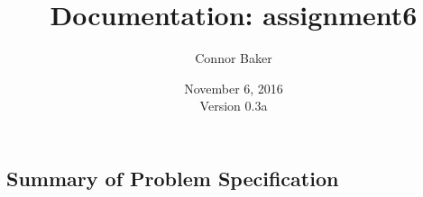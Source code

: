 \documentclass[12pt]{article}
\begin{document}
\null
\nointerlineskip 
\vfill
\let \snewpage \newpage
\let \newpage \relax
    \title{Documentation: assignment6}
    \author{Connor Baker}
    \date{November 6, 2016\\Version 0.3a}
\maketitle
\let \newpage \snewpage
\vfill



\newpage %


\makeatletter
\renewcommand*\l@section{\@dottedtocline{1}{0em}{1.5em}}
\makeatother

\tableofcontents
\clearpage

\begin{center}
\section{Summary of Problem Specification}
\end{center}
\end{document}

